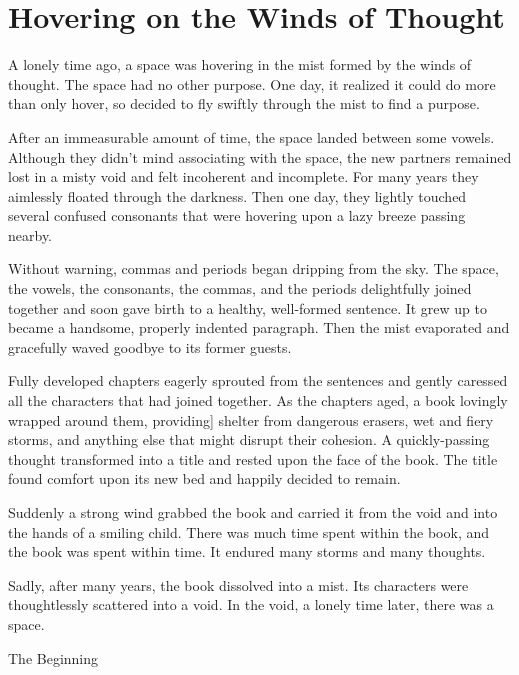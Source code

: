 \chapter{Hovering on the Winds of Thought}


A lonely time ago, a space was hovering in the mist formed by the winds of thought. The space had no other purpose. One day, it realized it could do more than only hover, so decided to fly swiftly through the mist to find a purpose.

After an immeasurable amount of time, the space landed between some vowels. Although they didn't mind associating with the space, the new partners remained lost in a misty void and felt incoherent and incomplete. For many years they aimlessly floated through the darkness. Then one day, they lightly touched several confused consonants that were hovering upon a lazy breeze passing nearby.

Without warning, commas and periods began dripping from the sky. The space, the vowels, the consonants, the commas, and the periods delightfully joined together and soon gave birth to a healthy, well-formed sentence. It grew up to became a handsome, properly indented paragraph. Then the mist evaporated and gracefully waved goodbye to its former guests.

Fully developed chapters eagerly sprouted from the sentences and gently caressed all the characters that had joined together. As the chapters aged, a book lovingly wrapped around them, providing] shelter from dangerous erasers, wet and fiery storms, and anything else that might disrupt their cohesion. A quickly-passing thought transformed into a title and rested upon the face of the book. The title found comfort upon its new bed and happily decided to remain.

Suddenly a strong wind grabbed the book and carried it from the void and into the hands of a smiling child. There was much time spent within the book, and the book was spent within time. It endured many storms and many thoughts.

Sadly, after many years, the book dissolved into a mist. Its characters were thoughtlessly scattered into a void.
\newpage
In the void, a lonely time later, there was a space.
\vspace*{\fill}

\centering
The Beginning
